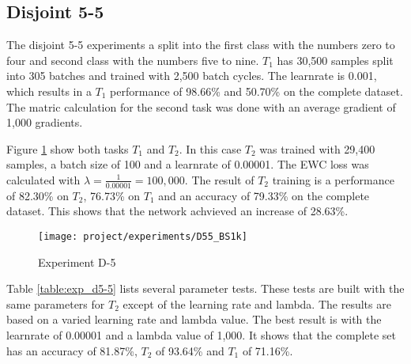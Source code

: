 \newpage

\subsection{Disjoint 5-5}

The disjoint 5-5 experiments a split into the first class with the numbers zero to four and second class with the numbers five to nine.
$T_1$ has 30,500 samples split into 305 batches and trained with 2,500 batch cycles.
The learnrate is 0.001, which results in a $T_1$ performance of 98.66\% and 50.70\% on the complete dataset.
The matric calculation for the second task was done with an average gradient of 1,000 gradients.

Figure \ref{fig:exp_d5-5_bs1k} show both tasks $T_1$ and $T_2$.
In this case $T_2$ was trained with 29,400 samples, a batch size of 100 and a learnrate of 0.00001.
The EWC loss was calculated with $\lambda = \frac{1}{0.00001} = 100,000$.
The result of $T_2$ training is a performance of 82.30\% on $T_2$, 76.73\% on $T_1$ and an accuracy of 79.33\% on the complete dataset.
This shows that the network achvieved an increase of 28.63\%.

\begin{figure}[H]
    \centering
    \texttt{[image: project/experiments/D55\_BS1k]}
    \caption{Experiment D-5}
    \label{fig:exp_d5-5_bs1k}
\end{figure}

\newpage

Table \ref{table:exp_d5-5} lists several parameter tests.
These tests are built with the same parameters for $T_2$ except of the learning rate and lambda.
The results are based on a varied learning rate and lambda value.
The best result is with the learnrate of 0.00001 and a lambda value of 1,000.
It shows that the complete set has an accuracy of 81.87\%, $T_2$ of 93.64\% and $T_1$ of 71.16\%.

